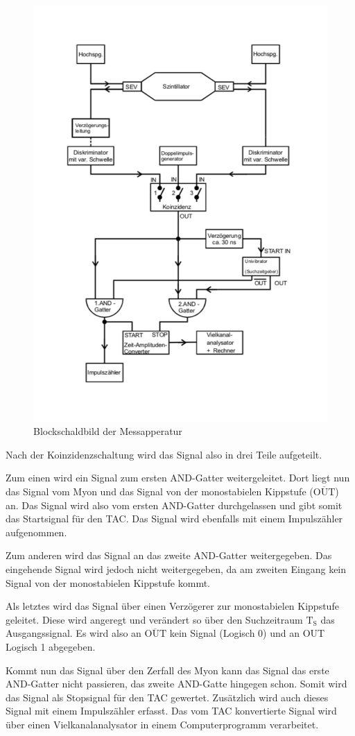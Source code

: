 \begin{figure}[h!]
  \centering
  \includegraphics[width=0.6 \textwidth]{schaltung.pdf}
  \caption{Blockschaldbild der Messapperatur \cite{1}}
  \label{fig:block}
\end{figure}
\FloatBarrier

Nach der Koinzidenzschaltung wird das Signal also in drei Teile aufgeteilt.

Zum einen wird ein Signal zum ersten AND-Gatter weitergeleitet.
Dort liegt nun das Signal vom Myon und das Signal von der monostabielen Kippstufe ($\overline{\text{OUT}}$) an.
Das Signal wird also vom ersten AND-Gatter durchgelassen und gibt somit das Startsignal für den TAC.
Das Signal wird ebenfalls mit einem Impulszähler aufgenommen.

Zum anderen wird das Signal an das zweite AND-Gatter weitergegeben.
Das eingehende Signal wird jedoch nicht weitergegeben, da am zweiten Eingang kein Signal von der monostabielen Kippstufe kommt.

Als letztes wird das Signal über einen Verzögerer zur monostabielen Kippstufe geleitet.
Diese wird angeregt und verändert so über den Suchzeitraum $\text{T}_{\text{S}}$ das Ausgangssignal.
Es wird also an $\overline{\text{OUT}}$ kein Signal (Logisch 0) und an OUT Logisch 1 abgegeben.

Kommt nun das Signal über den Zerfall des Myon kann das Signal das erste AND-Gatter nicht passieren, das zweite AND-Gatte hingegen schon.
Somit wird das Signal als Stopsignal für den TAC gewertet.
Zusätzlich wird auch dieses Signal mit einem Impulszähler erfasst.
Das vom TAC konvertierte Signal wird über einen Vielkanalanalysator in einem Computerprogramm verarbeitet.

